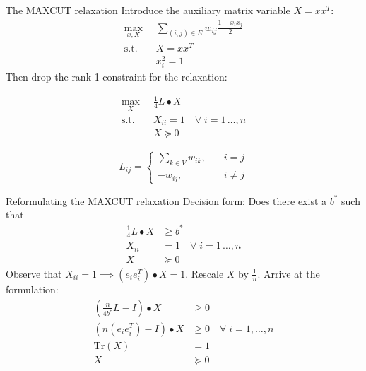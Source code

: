 \documentclass{beamer}
\begin{document}
\begin{frame}{The MAXCUT relaxation}
Introduce the auxiliary matrix variable $X = xx^T$:
\begin{align*}
\max_{x,X} \;\;  & \sum_{(i,j) \in E} w_{ij}\frac{1-x_ix_j}{2} \\
\text{s.t.} \;\; & X = xx^T \\
 & x_i^2 = 1
\end{align*}
Then drop the rank 1 constraint for the relaxation:

\begin{minipage}{0.6\linewidth}


\begin{align*}
\max_{X} \;\;  & \frac{1}{4} L \bullet X \\
\text{s.t.} \;\; & X_{ii} = 1 \quad \forall \; i=1\,\ldots,n\\
 & X \succcurlyeq 0
\end{align*}

\end{minipage}
\begin{minipage}{0.3\linewidth}

$$
L_{ij} = \left\{ \begin{aligned}
\sum _{k\in V} w_{ik},  \quad & i = j \\
-w_{ij}, \quad & i \neq j
\end{aligned}\right.
$$

\end{minipage}
\end{frame}

\begin{frame}{Reformulating the MAXCUT relaxation}
Decision form: Does there exist a $b^*$ such that
\begin{align*}
\frac{1}{4} L \bullet X &\geq b^* \\
X_{ii} &= 1 \quad \forall \; i=1\,\ldots,n\\
X &\succcurlyeq 0
\end{align*}
Observe that $X_{ii} = 1 \implies (e_ie_i^T)\bullet X = 1$. Rescale $X$ by $\frac{1}{n}$. Arrive at the formulation:
\begin{align*}
\left(\frac{n}{4b^*} L - I\right) \bullet X &\geq 0 \\
\left(n(e_ie_i^T) - I\right) \bullet X &\geq 0 \quad \forall \; i = 1,\ldots,n \\
\text{Tr}(X) &= 1 \\
X &\succcurlyeq 0
\end{align*}
\end{frame}
\end{document}
